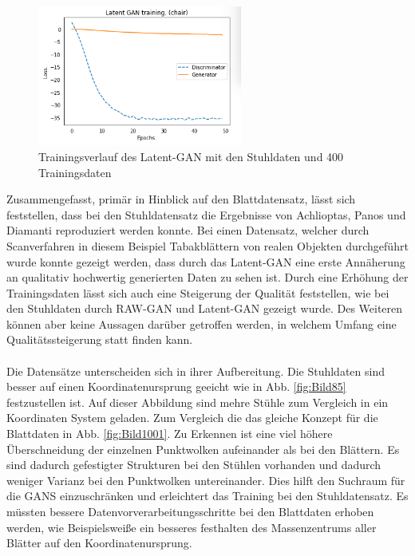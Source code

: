 \documentclass{llncs}
\begin{document}
\begin{figure}[htbp] 
	\centering
	\includegraphics[width=0.6\textwidth]{raw_gan_latent_gan_chair_result_400_example.png}
	\caption{Trainingsverlauf des Latent-GAN mit den Stuhldaten und 400 Trainingsdaten}
	\label{fig:Bild65}
\end{figure}
\pagebreak\linebreak
Zusammengefasst, primär in Hinblick auf den Blattdatensatz, lässt sich feststellen, dass bei den Stuhldatensatz die Ergebnisse von Achlioptas, Panos und Diamanti\cite{3dgan} reproduziert werden konnte. Bei einen Datensatz, welcher durch Scanverfahren in diesem Beispiel Tabakblättern von realen Objekten durchgeführt wurde konnte gezeigt werden, dass durch das Latent-GAN eine erste Annäherung an qualitativ hochwertig generierten Daten zu sehen ist. Durch eine Erhöhung der Trainingsdaten lässt sich auch eine Steigerung der Qualität feststellen, wie bei den Stuhldaten durch RAW-GAN und Latent-GAN gezeigt wurde. Des Weiteren können aber keine Aussagen darüber getroffen werden, in welchem Umfang eine Qualitätssteigerung statt finden kann. 
\\\\
Die Datensätze unterscheiden sich in ihrer Aufbereitung. Die Stuhldaten sind besser auf einen Koordinatenursprung geeicht wie in Abb. \ref{fig:Bild85} festzustellen ist. Auf dieser Abbildung sind mehre Stühle zum Vergleich in ein Koordinaten System geladen. Zum Vergleich die das gleiche Konzept für die Blattdaten in Abb. \ref{fig:Bild1001}.
Zu Erkennen ist eine viel höhere Überschneidung der einzelnen Punktwolken aufeinander als bei den Blättern. Es sind dadurch gefestigter Strukturen bei den Stühlen vorhanden und dadurch weniger Varianz bei den Punktwolken untereinander. Dies hilft den Suchraum für die GANS einzuschränken und erleichtert das Training bei den Stuhldatensatz. Es müssten bessere Datenvorverarbeitungsschritte bei den Blattdaten erhoben werden, wie Beispielsweiße ein besseres festhalten des Massenzentrums aller Blätter auf den Koordinatenursprung.
\end{document}
